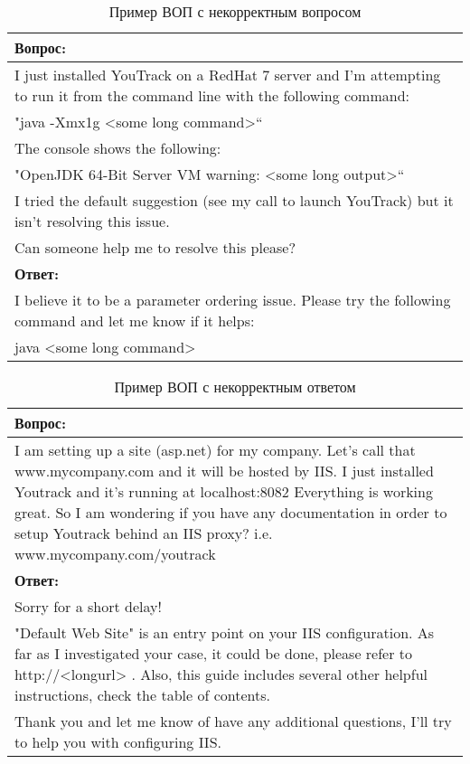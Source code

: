 \begin{table}[tph!]
\caption{Пример ВОП с некорректным вопросом}
\label{vop_ok}
\centering
\begin{tabular}{|L{11cm}|}
\hline
\textbf{Вопрос:}\\
\hline
I just installed YouTrack on a RedHat 7 server and I'm attempting to run it from the command line with the following command:\\
"java -Xmx1g  <some long command>“\\
The console shows the following:\\
"OpenJDK 64-Bit Server VM warning: <some long output>“\\
I tried the default suggestion (see my call to launch YouTrack) but it isn't resolving this issue.\\
Can someone help me to resolve this please?
\\
\hline
\textbf{Ответ:}\\
\hline
I believe it to be a parameter ordering issue. Please try the following command and let me know if it helps:\\
java  <some long command>
\\
\hline
\end{tabular}
\end{table}

\begin{table}[tph!]
\caption{Пример ВОП с некорректным ответом}
\label{vop_ok}
\centering
\begin{tabular}{|L{11cm}|}
\hline
\textbf{Вопрос:}\\
\hline
I am setting up a site (asp.net) for my company. Let's call that www.mycompany.com and it will be hosted by IIS. I just installed Youtrack and it's running at localhost:8082 Everything is working great. So I am wondering if you have any documentation in order to setup Youtrack behind an IIS proxy? i.e. www.mycompany.com/youtrack \\
\hline
\textbf{Ответ:}\\
\hline
Sorry for a short delay!\\
"Default Web Site" is an entry point on your IIS configuration. As far as I investigated your case, it could be done, please refer to http://<longurl> . Also, this guide includes several other helpful instructions, check the table of contents.\\
Thank you and let me know of have any additional questions, I'll try to help you with configuring IIS.
\\
\hline
\end{tabular}
\end{table}